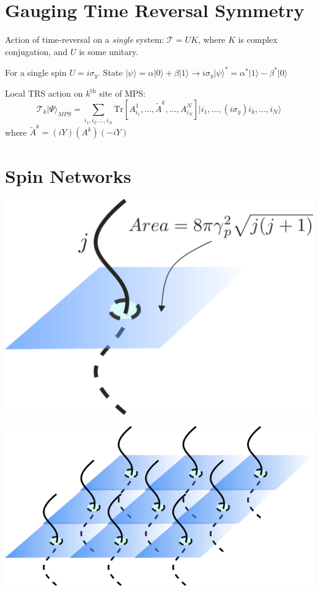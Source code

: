 \documentclass[a0,portrait]{a0poster}
\newcommand{\mc}[1]{\mathcal{#1}}
\newcommand{\ket}[1]{\vert #1 \rangle}
\newcommand{\Tr}{\mathrm{Tr}}
\begin{document}
\begin{multicols}{2}
\section*{Gauging Time Reversal Symmetry}

Action of time-reversal on a \emph{single} system: $ \mc{T} = UK $, where $ K $ is complex conjugation, and $ U $ is some unitary.

For a single spin $ U = i\sigma_y $. State $ \ket{\psi} = \alpha \ket{0} + \beta \ket{1} \rightarrow i\sigma_y \ket{\psi}^* = \alpha^* \ket{1} - \beta^*\ket{0} $

Local TRS action on $ k^\text{th} $ site of MPS:
\[ \mc{T}_k \ket{\Psi}_{MPS} = \sum_{i_1, i_2, \ldots, i_N} \Tr\left[ A^{1}_{i_1},\ldots,\tilde{A}^k,\ldots, A^{N}_{i_N} \right] \ket{i_1, \ldots, (i\sigma_y) i_k, \ldots, i_N} \]
where $ \tilde{A}^k = (iY)(A^{k})(-iY) $






\section*{Spin Networks}

\begin{minipage}[t]{0.45\linewidth}
	\centering
	\includegraphics[width=0.5\linewidth]{area_puncture}
\end{minipage}
\begin{minipage}[t]{0.45\linewidth}
	\centering
	\includegraphics[width=0.6\linewidth]{area_punctures}
\end{minipage}



\end{multicols}
\end{document}
